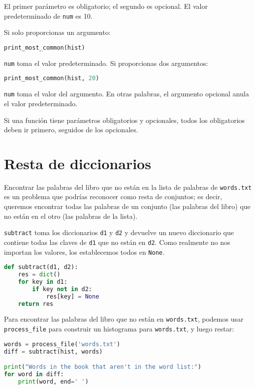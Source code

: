 El primer parámetro es obligatorio; el segundo es opcional. El valor predeterminado de \texttt{num} es 10.

Si solo proporcionas un argumento:

\begin{lstlisting}[language=Python]
print_most_common(hist)
\end{lstlisting}

\texttt{num} toma el valor predeterminado. Si proporcionas dos argumentos:

\begin{lstlisting}[language=Python]
print_most_common(hist, 20)
\end{lstlisting}

\texttt{num} toma el valor del argumento. En otras palabras, el argumento opcional anula el valor predeterminado.

Si una función tiene parámetros obligatorios y opcionales, todos los obligatorios deben ir primero, seguidos de los opcionales.

\section{Resta de diccionarios}

Encontrar las palabras del libro que no están en la lista de palabras de \texttt{words.txt} es un problema que podrías reconocer como resta de conjuntos; es decir, queremos encontrar todas las palabras de un conjunto (las palabras del libro) que no están en el otro (las palabras de la lista).

\texttt{subtract} toma los diccionarios \texttt{d1} y \texttt{d2} y devuelve un nuevo diccionario que contiene todas las claves de \texttt{d1} que no están en \texttt{d2}. Como realmente no nos importan los valores, los establecemos todos en \texttt{None}.

\begin{lstlisting}[language=Python]
def subtract(d1, d2):
    res = dict()
    for key in d1:
        if key not in d2:
            res[key] = None
    return res
\end{lstlisting}

Para encontrar las palabras del libro que no están en \texttt{words.txt}, podemos usar \texttt{process\_file} para construir un histograma para \texttt{words.txt}, y luego restar:

\begin{lstlisting}[language=Python]
words = process_file('words.txt')
diff = subtract(hist, words)

print("Words in the book that aren't in the word list:")
for word in diff:
    print(word, end=' ')
\end{lstlisting}


